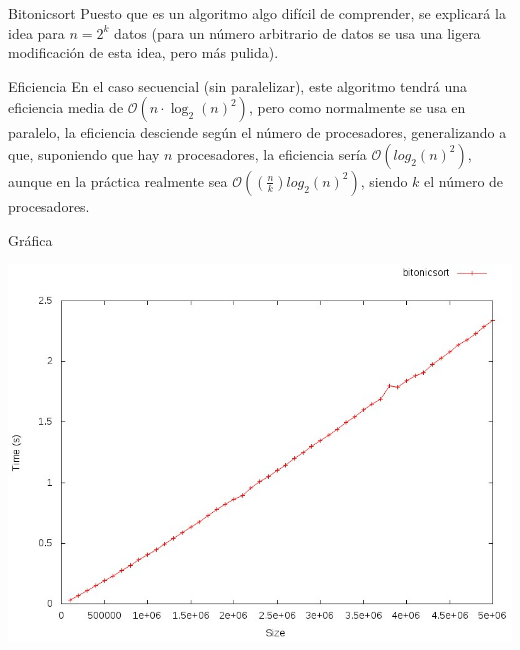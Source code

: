 \documentclass[compress]{beamer}
\begin{document}
\begin{frame}{Bitonicsort}
Puesto que es un algoritmo algo difícil de comprender, se explicará la idea para $n = 2^k$ datos (para un número arbitrario de datos se usa una ligera modificación de esta idea, pero más pulida).\\
\vspace{0.20in}
	\begin{block}{Eficiencia}
	En el caso secuencial (sin paralelizar), este algoritmo tendrá una eficiencia media de $\mathcal{O}(n\cdot\log_2(n)^2)$, pero como normalmente se usa en paralelo, la eficiencia desciende según el número de procesadores, generalizando a que, suponiendo que hay $n$ procesadores, la eficiencia sería $\mathcal{O}(log_2(n)^2)$, aunque en la práctica realmente sea $\mathcal{O}((\tfrac{n}{k})log_2(n)^2)$, siendo $k$ el número de procesadores.
	\end{block}
\end{frame}

\begin{frame}{Gráfica}
	\begin{alertblock}{}
		\begin{center}
		\includegraphics[scale=0.40]{images/bitonicsort.jpeg}
		\end{center}
	\end{alertblock}
\end{frame}
\end{document}
